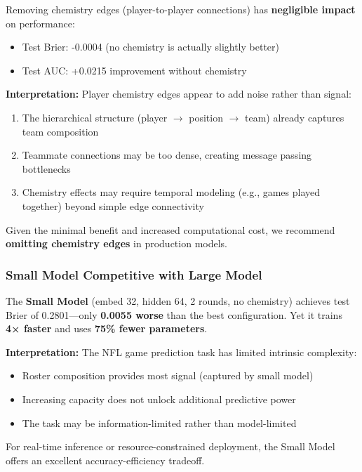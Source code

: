 Removing chemistry edges (player-to-player connections) has \textbf{negligible impact} on performance:
\begin{itemize}[noitemsep]
    \item Test Brier: -0.0004 (no chemistry is actually slightly better)
    \item Test AUC: +0.0215 improvement without chemistry
\end{itemize}

\textbf{Interpretation:} Player chemistry edges appear to add noise rather than signal:
\begin{enumerate}[noitemsep]
    \item The hierarchical structure (player $\rightarrow$ position $\rightarrow$ team) already captures team composition
    \item Teammate connections may be too dense, creating message passing bottlenecks
    \item Chemistry effects may require temporal modeling (e.g., games played together) beyond simple edge connectivity
\end{enumerate}

Given the minimal benefit and increased computational cost, we recommend \textbf{omitting chemistry edges} in production models.

\subsubsection{Small Model Competitive with Large Model}
\label{subsubsec:gnn_capacity}

The \textbf{Small Model} (embed 32, hidden 64, 2 rounds, no chemistry) achieves test Brier of 0.2801—only \textbf{0.0055 worse} than the best configuration. Yet it trains \textbf{4× faster} and uses \textbf{75\% fewer parameters}.

\textbf{Interpretation:} The NFL game prediction task has limited intrinsic complexity:
\begin{itemize}[noitemsep]
    \item Roster composition provides most signal (captured by small model)
    \item Increasing capacity does not unlock additional predictive power
    \item The task may be information-limited rather than model-limited
\end{itemize}

For real-time inference or resource-constrained deployment, the Small Model offers an excellent accuracy-efficiency tradeoff.

